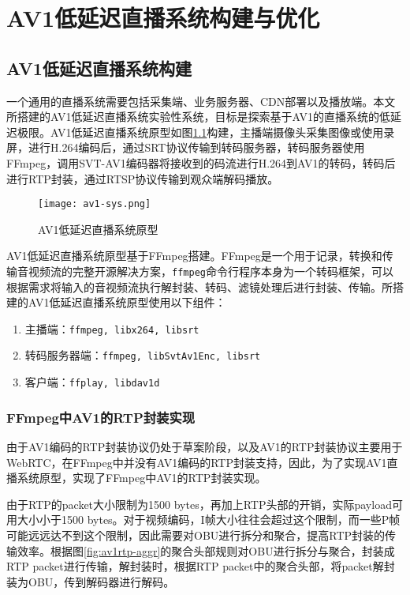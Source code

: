 \chapter{AV1低延迟直播系统构建与优化}

\section{AV1低延迟直播系统构建}
	一个通用的直播系统需要包括采集端、业务服务器、CDN部署以及播放端。本文所搭建的AV1低延迟直播系统实验性系统，目标是探索基于AV1的直播系统的低延迟极限。AV1低延迟直播系统原型如图\ref{fig:av1-sys}构建，主播端摄像头采集图像或使用录屏，进行H.264编码后，通过SRT协议传输到转码服务器，转码服务器使用FFmpeg，调用SVT-AV1编码器将接收到的码流进行H.264到AV1的转码，转码后进行RTP封装，通过RTSP协议传输到观众端解码播放。

  \begin{figure}[!htp]
    \centering
    \texttt{[image: av1-sys.png]}
    \caption{AV1低延迟直播系统原型}
   \label{fig:av1-sys}
  \end{figure}

  AV1低延迟直播系统原型基于FFmpeg搭建。FFmpeg是一个用于记录，转换和传输音视频流的完整开源解决方案，\texttt{ffmpeg}命令行程序本身为一个转码框架，可以根据需求将输入的音视频流执行解封装、转码、滤镜处理后进行封装、传输。所搭建的AV1低延迟直播系统原型使用以下组件：
	\begin{enumerate} [label=\arabic*)]
		\item 主播端：\texttt{ffmpeg, libx264, libsrt}
		\item 转码服务器端：\texttt{ffmpeg, libSvtAv1Enc, libsrt}
		\item 客户端：\texttt{ffplay, libdav1d}
	\end{enumerate}
\subsection{FFmpeg中AV1的RTP封装实现}
	由于AV1编码的RTP封装协议\cite{RTPPayloadFormat}仍处于草案阶段，以及AV1的RTP封装协议主要用于WebRTC，在FFmpeg中并没有AV1编码的RTP封装支持，因此，为了实现AV1直播系统原型，实现了FFmpeg中AV1的RTP封装实现。

	由于RTP的packet大小限制为1500 bytes，再加上RTP头部的开销，实际payload可用大小小于1500 bytes。对于视频编码，I帧大小往往会超过这个限制，而一些P帧可能远远达不到这个限制，因此需要对OBU进行拆分和聚合，提高RTP封装的传输效率。根据图\ref{fig:av1rtp-aggr}的聚合头部规则对OBU进行拆分与聚合，封装成RTP packet进行传输，解封装时，根据RTP packet中的聚合头部，将packet解封装为OBU，传到解码器进行解码。

